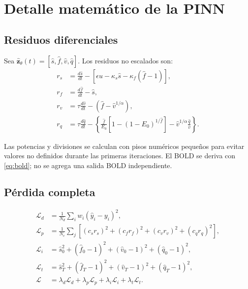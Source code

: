\chapter{Detalle matemático de la PINN}

\section{Residuos diferenciales}
Sea $\hat{\bm z}_\theta(t)=[\hat s,\hat f,\hat v,\hat q]$. Los residuos no escalados son:
\begin{align}
r_s &= \frac{d\hat s}{dt}-\left[\epsilon u-\kappa_s\hat s-\kappa_f(\hat f-1)\right],\\
r_f &= \frac{d\hat f}{dt}-\hat s,\\
r_v &= \tau\frac{d\hat v}{dt}-\left(\hat f-\hat v^{1/\alpha}\right),\\
r_q &= \tau\frac{d\hat q}{dt}-\left\{\frac{\hat f}{E_0}\left[1-(1-E_0)^{1/\hat f}\right]-\hat v^{1/\alpha}\frac{\hat q}{\hat v}\right\}.
\end{align}

Las potencias y divisiones se calculan con pisos numéricos pequeños para evitar valores no definidos durante las primeras iteraciones. El BOLD se deriva con \cref{eq:bold}; no se agrega una salida BOLD independiente.

\section{Pérdida completa}
\begin{align}
\mathcal L_d &= \frac{1}{N_d}\sum_i w_i(\hat y_i-y_i)^2,\\
\mathcal L_p &= \frac{1}{N_c}\sum_j\left[(c_sr_s)^2+(c_fr_f)^2+(c_vr_v)^2+(c_qr_q)^2\right],\\
\mathcal L_i &= \hat s_0^2+(\hat f_0-1)^2+(\hat v_0-1)^2+(\hat q_0-1)^2,\\
\mathcal L_t &= \hat s_T^2+(\hat f_T-1)^2+(\hat v_T-1)^2+(\hat q_T-1)^2,\\
\mathcal L &= \lambda_d\mathcal L_d+\lambda_p\mathcal L_p+\lambda_i\mathcal L_i+\lambda_t\mathcal L_t.
\end{align}

